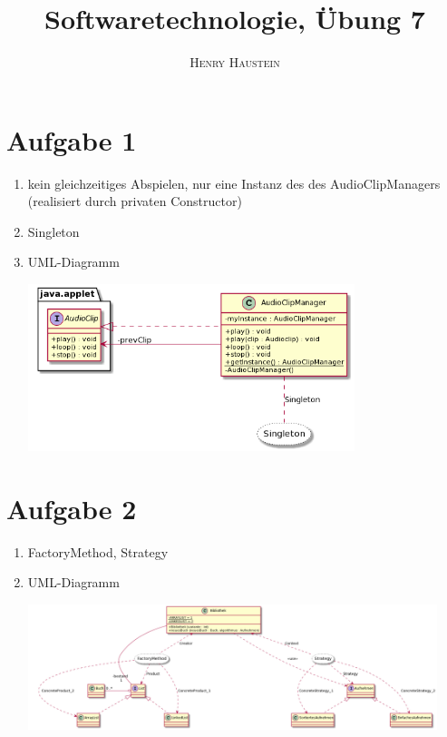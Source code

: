 \documentclass{article}
\title{\textbf{Softwaretechnologie, Übung 7}}
\author{\textsc{Henry Haustein}}
\date{}
\begin{document}
	\maketitle
	
	\section*{Aufgabe 1}
	\begin{enumerate}[label=(\alph*)]
		\item kein gleichzeitiges Abspielen, nur eine Instanz des des AudioClipManagers (realisiert durch privaten Constructor)
		\item Singleton
		\item UML-Diagramm
		\begin{center}
			\includegraphics[width=0.75\textwidth]{./Aufgabe7_1}
		\end{center}
	\end{enumerate}

	\section*{Aufgabe 2}
	\begin{enumerate}[label=(\alph*)]
		\item FactoryMethod, Strategy
		\item UML-Diagramm
		\begin{center}
			\includegraphics[width=0.94\textwidth]{./Aufgabe7_2}
		\end{center}
	\end{enumerate}
\end{document}
